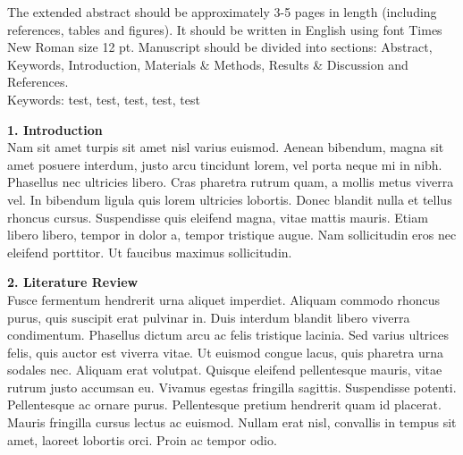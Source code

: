 \begin{extendedabstract}

The extended abstract should be approximately 3-5 pages in length (including references, tables and figures). It should be written in English using font Times New Roman size 12 pt. Manuscript should be divided into sections: Abstract, Keywords, Introduction, Materials \& Methods, Results \& Discussion and References. 
\\

\noindent
Keywords: test, test, test, test, test

\clearpage %

{\fontsize{16}{18}\selecefont
\noindent
\bf{1. Introduction}}\\

Nam sit amet turpis sit amet nisl varius euismod. Aenean bibendum, magna sit amet posuere interdum, justo arcu tincidunt lorem, vel porta neque mi in nibh. Phasellus nec ultricies libero. Cras pharetra rutrum quam, a mollis metus viverra vel. In bibendum ligula quis lorem ultricies lobortis. Donec blandit nulla et tellus rhoncus cursus. Suspendisse quis eleifend magna, vitae mattis mauris. Etiam libero libero, tempor in dolor a, tempor tristique augue. Nam sollicitudin eros nec eleifend porttitor. Ut faucibus maximus sollicitudin. 

\vspace{1.5em}

{\fontsize{16}{18}\selecefont
\noindent
\bf{2. Literature Review}}\\

Fusce fermentum hendrerit urna aliquet imperdiet. Aliquam commodo rhoncus purus, quis suscipit erat pulvinar in. Duis interdum blandit libero viverra condimentum. Phasellus dictum arcu ac felis tristique lacinia. Sed varius ultrices felis, quis auctor est viverra vitae. Ut euismod congue lacus, quis pharetra urna sodales nec. Aliquam erat volutpat. Quisque eleifend pellentesque mauris, vitae rutrum justo accumsan eu. Vivamus egestas fringilla sagittis. Suspendisse potenti. Pellentesque ac ornare purus. Pellentesque pretium hendrerit quam id placerat. Mauris fringilla cursus lectus ac euismod. Nullam erat nisl, convallis in tempus sit amet, laoreet lobortis orci. Proin ac tempor odio.

\end{extendedabstract}
